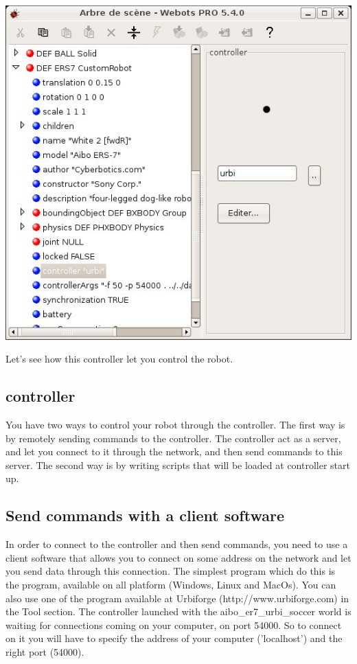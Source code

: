 \begin{center}
  \includegraphics[width=.8\linewidth]{img/webots/scene-tree}
\end{center}

Let's see how this controller let you control the robot.


\subsection{\urbi controller}

You have two ways to control your robot through the \urbi
controller. The first way is by remotely sending commands to the \urbi
controller. The \urbi controller act as a server, and let you connect
to it through the network, and then send \urbi commands to this server.
The second way is by writing \urbi scripts that will be loaded at
controller start up.


\subsection{Send commands with a client software}

In order to connect to the \urbi controller and then send commands, you
need to use a client software that allows you to connect on some
address on the network and let you send data through this connection.
The simplest program which do this is the  program,
available on all platform (Windows, Linux and MacOs). You can also use
one of the program available at Urbiforge (http://www.urbiforge.com)
in the Tool section.  The \urbi controller launched with the
aibo\_er7\_urbi\_soccer world is waiting for connections coming on
your computer, on port 54000. So to connect on it you will have to
specify the address of your computer ('localhost') and the right port
(54000).


